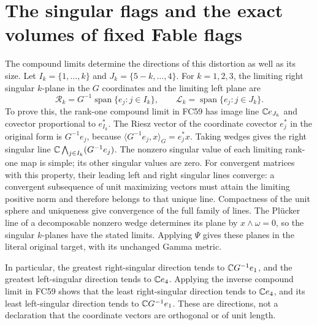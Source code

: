 \section{The singular flags and the exact volumes of fixed Fable flags}
The compound limits determine the directions of this distortion as well
as its size. Let $I_k=\{1,\ldots,k\}$ and
$J_k=\{5-k,\ldots,4\}$. For $k=1,2,3$, the limiting right
singular $k$-plane in the $G$ coordinates and the limiting left plane are
\[
 \mathcal R_k=G^{-1}\operatorname{span}\{e_j:j\in I_k\},\qquad
 \mathcal L_k=\operatorname{span}\{e_j:j\in J_k\}.
 \tag{FC68}
\]
To prove this, the rank-one compound limit in FC59 has image line
$\mathbb C e_{J_k}$ and covector proportional to $e_{I_k}^*$.
The Riesz vector of the coordinate covector $e_j^*$ in the original
form is $G^{-1}e_j$, because
$\langle G^{-1}e_j,x\rangle_G=e_j^*x$.
Taking wedges gives the right singular line
$\mathbb C\bigwedge_{j\in I_k}(G^{-1}e_j)$. The nonzero singular value
of each limiting rank-one map is simple; its other singular values
are zero. For convergent matrices with this property, their leading
left and right singular lines converge: a convergent subsequence of
unit maximizing vectors must attain the limiting positive norm and
therefore belongs to that unique line. Compactness of the unit sphere
and uniqueness give convergence of the full family of lines. The
Pl\"ucker line of a decomposable nonzero wedge determines its plane
by $x\wedge\omega=0$, so the singular $k$-planes have the stated
limits. Applying $\Psi$ gives these planes in the literal original
target, with its unchanged Gamma metric.

In particular, the greatest right-singular direction tends to
$\mathbb C G^{-1}e_1$, and the greatest left-singular direction tends to
$\mathbb C e_4$. Applying the inverse compound limit in FC59 shows that
the least right-singular direction tends to $\mathbb C e_4$, and its
least left-singular direction tends to $\mathbb C G^{-1}e_1$.
These are directions, not a declaration that the coordinate vectors
are orthogonal or of unit length.

